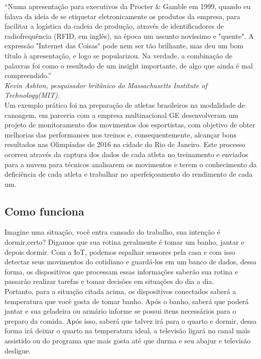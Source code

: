 \documentclass[11pt]{classe_cn}                 %
\begin{document}
“Numa apresentação para executivos da Procter & Gamble em 1999, quando eu 
falava da ideia de se etiquetar eletronicamente os produtos da empresa, 
para facilitar a logística da cadeia de produção, através de identificadores 
de radiofrequência (RFID, em inglês), na época um assunto novíssimo e "quente". 
A expressão "Internet das Coisas" pode nem ser tão brilhante, mas deu um bom 
título à apresentação, e logo se popularizou. Na verdade, a combinação de 
palavras foi como o resultado de um insight importante, de algo que ainda 
é mal compreendido.”\\

\textit{Kevin Ashton, pesquisador britânico do Massachusetts Institute of Technology(MIT).}\\

Um exemplo prático foi na preparação de atletas brasileiros na modalidade de canoagem, 
em parceria com a empresa multinacional GE desenvolveram um projeto de monitoramento 
dos movimentos dos esportistas, com objetivo de obter melhorias das performances nos 
treinos e, consequentemente, alcançar bons resultados nas Olimpíadas de 2016 na 
cidade do Rio de Janeiro. Este processo ocorreu através da captura dos dados de 
cada atleta no treinamento e enviados para a nuvem para técnicos analisarem os 
movimentos e terem o conhecimento da deficiência de cada atleta e trabalhar no 
aperfeiçoamento do rendimento de cada um.

\subsection{Como funciona}
Imagine uma situação, você entra cansado do trabalho, sua intenção 
é dormir,certo? Digamos que sua rotina geralmente é tomar um banho, 
jantar e depois dormir. Com a IoT, podemos espalhar sensores pela 
casa e com isso detectar seus movimentos do cotidiano e guardá-los 
em um banco de dados, dessa forma, os dispositivos que processam 
essas informações saberão sua rotina e passarão realizar tarefas 
e tomar decisões em situações do dia a dia.\\

Portanto, para a situação citada acima, os dispositivos conectados 
saberá a temperatura que você gosta de tomar banho. Após o banho, 
saberá que poderá jantar e sua geladeira ou armário informe se 
possui itens necessários para o preparo da comida. Após isso, 
saberá que talvez irá para o quarto e dormir, dessa forma irá 
deixar o quarto na temperatura ideal, a televisão ligará no canal 
mais assistido ou do programa que mais gosta até que durma e seu 
abajur e televisão desligue.\\
\end{document}
